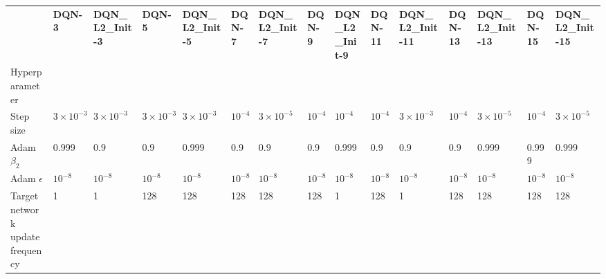 \begin{tabular}{lllllllllllllll}
 & \bfseries DQN-3 & \bfseries DQN_L2_Init-3 & \bfseries DQN-5 & \bfseries DQN_L2_Init-5 & \bfseries DQN-7 & \bfseries DQN_L2_Init-7 & \bfseries DQN-9 & \bfseries DQN_L2_Init-9 & \bfseries DQN-11 & \bfseries DQN_L2_Init-11 & \bfseries DQN-13 & \bfseries DQN_L2_Init-13 & \bfseries DQN-15 & \bfseries DQN_L2_Init-15 \\
Hyperparameter &  &  &  &  &  &  &  &  &  &  &  &  &  &  \\
Step size & $3 \times 10^{-3}$ & $3 \times 10^{-3}$ & $3 \times 10^{-3}$ & $3 \times 10^{-3}$ & $10^{-4}$ & $3 \times 10^{-5}$ & $10^{-4}$ & $10^{-4}$ & $10^{-4}$ & $3 \times 10^{-3}$ & $10^{-4}$ & $3 \times 10^{-5}$ & $10^{-4}$ & $3 \times 10^{-5}$ \\
Adam $\beta_2$ & 0.999 & 0.9 & 0.9 & 0.999 & 0.9 & 0.9 & 0.9 & 0.999 & 0.9 & 0.9 & 0.9 & 0.999 & 0.999 & 0.999 \\
Adam $\epsilon$ & $10^{-8}$ & $10^{-8}$ & $10^{-8}$ & $10^{-8}$ & $10^{-8}$ & $10^{-8}$ & $10^{-8}$ & $10^{-8}$ & $10^{-8}$ & $10^{-8}$ & $10^{-8}$ & $10^{-8}$ & $10^{-8}$ & $10^{-8}$ \\
Target network update frequency & 1 & 1 & 128 & 128 & 128 & 128 & 128 & 1 & 128 & 1 & 128 & 128 & 128 & 128 \\
\end{tabular}

